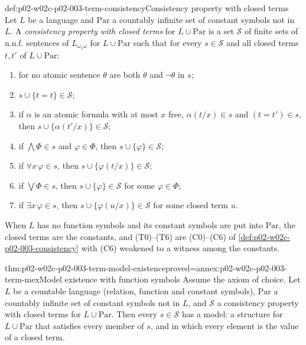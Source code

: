 \begin{hbdefinition}{def:p02-w02c-p02-003-term-consistency}{Consistency property with closed terms}
Let \(L\) be a language and \(\mathrm{Par}\) a countably infinite set of
constant symbols not in \(L\).  A \emph{consistency property with closed
terms} for \(L\cup\mathrm{Par}\) is a set \(\mathcal S\) of finite sets of
n.n.f. sentences of \(L_{\omega_1\omega}\) for \(L\cup\mathrm{Par}\) such
that for every \(s\in\mathcal S\) and all closed terms \(t,t'\) of
\(L\cup\mathrm{Par}\):
\begin{enumerate}
\item[(T0)] for no atomic sentence \(\theta\) are both \(\theta\) and
      \(\neg\theta\) in \(s\);
\item[(T1)] \(s\cup\{t=t\}\in\mathcal S\);
\item[(T2)] if \(\alpha\) is an atomic formula with at most \(x\) free,
      \(\alpha(t/x)\in s\) and \((t=t')\in s\), then
      \(s\cup\{\alpha(t'/x)\}\in\mathcal S\);
\item[(T3)] if \(\bigwedge\Phi\in s\) and \(\varphi\in\Phi\), then
      \(s\cup\{\varphi\}\in\mathcal S\);
\item[(T4)] if \(\forall x\,\varphi\in s\), then
      \(s\cup\{\varphi(t/x)\}\in\mathcal S\);
\item[(T5)] if \(\bigvee\Phi\in s\), then \(s\cup\{\varphi\}\in\mathcal S\)
      for some \(\varphi\in\Phi\);
\item[(T6)] if \(\exists x\,\varphi\in s\), then
      \(s\cup\{\varphi(u/x)\}\in\mathcal S\) for some closed term \(u\).
\end{enumerate}
When \(L\) has no function symbols and its constant symbols are put into
\(\mathrm{Par}\), the closed terms are the constants, and (T0)--(T6) are
(C0)--(C6) of \cref{def:p02-w02c-p02-003-consistency} with (C6) weakened
to a witness among the constants.
\end{hbdefinition}

\begin{hbtheorem}{thm:p02-w02c-p02-003-term-model-existence}{proved=annex:p02-w02c-p02-003-term-mex}{Model existence with function symbols}
Assume the axiom of choice.  Let \(L\) be a countable language (relation,
function and constant symbols), \(\mathrm{Par}\) a countably infinite set of
constant symbols not in \(L\), and \(\mathcal S\) a consistency property
with closed terms for \(L\cup\mathrm{Par}\).  Then every
\(s\in\mathcal S\) has a model: a structure for \(L\cup\mathrm{Par}\) that
satisfies every member of \(s\), and in which every element is the value
of a closed term.
\end{hbtheorem}

